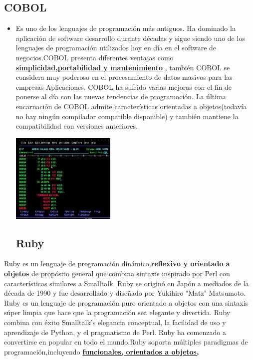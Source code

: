 \documentclass[twoside,twocolumn]{article}
\begin{document}
\subsection{COBOL}
\begin{itemize}
\item Es uno de los lenguajes de programación más antiguos. Ha dominado la aplicación de software desarrollo durante décadas y sigue siendo uno de los lenguajes de programación utilizados hoy en día en el software de negocios.COBOL presenta diferentes ventajas como
{\bf \underline{simplicidad,portabilidad y mantenimiento}}
, también COBOL se considera muy poderoso en el procesamiento de datos masivos para las empresas Aplicaciones. COBOL ha sufrido varias mejoras con el fin de ponerse al día con las nuevas tendencias de programación. La última encarnación de COBOL admite características orientadas a objetos(todavía no hay ningún compilador compatible disponible) y también mantiene la compatibilidad con versiones anteriores.
\begin{center}
	\includegraphics[width=5cm]{./Imagenes/3} 
	\end{center}
\subsection{Ruby}
\end{itemize}
Ruby es un lenguaje de programación dinámico,{\bf \underline {reflexivo y orientado a objetos}}  de propósito general que combina sintaxis
inspirado por Perl con características similares a Smalltalk. Ruby se originó en Japón a mediados de la década de 1990 y fue
desarrollado y diseñado por Yukihiro "Matz" Matsumoto. Ruby es un lenguaje de programación puro orientado a objetos
con una sintaxis súper limpia que hace que la programación sea elegante y divertida. Ruby combina con éxito Smalltalk's
elegancia conceptual, la facilidad de uso y aprendizaje de Python, y el pragmatismo de Perl. Ruby ha comenzado a convertirse en
popular en todo el mundo.Ruby soporta múltiples paradigmas de programación,incluyendo {\bf \underline {funcionales, orientados a objetos,}}
\end{document}
